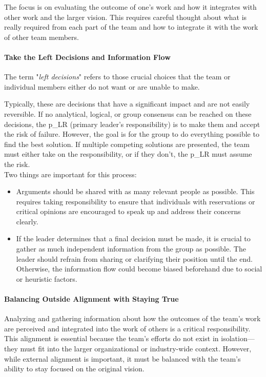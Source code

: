 The focus is on evaluating the outcome of one's work and how it integrates with other work and the larger vision. This requires careful thought about what is really required from each part of the team and how to integrate it with the work of other team members.

\paragraph{Take the Left Decisions and Information Flow}
The term "\textit{left decisions}" refers to those crucial choices that the team or individual members either do not want or are unable to make.

Typically, these are decisions that have a significant impact and are not easily reversible. If no analytical, logical, or group consensus can be reached on these decisions, the \gls{p_LR} (primary leader's responsibility) is to make them and accept the risk of failure. However, the goal is for the group to do everything possible to find the best solution. If multiple competing solutions are presented, the team must either take on the responsibility, or if they don't, the \gls{p_LR} must assume the risk.\\

Two things are important for this process:
\begin{itemize}
	\item Arguments should be shared with as many relevant people as possible. This requires taking responsibility to ensure that individuals with reservations or critical opinions are encouraged to speak up and address their concerns clearly.
	\item If the leader determines that a final decision must be made, it is crucial to gather as much independent information from the group as possible. The leader should refrain from sharing or clarifying their position until the end. Otherwise, the information flow could become biased beforehand due to social or heuristic factors.
\end{itemize}

\paragraph{Balancing Outside Alignment with Staying True}

Analyzing and gathering information about how the outcomes of the team's work are perceived and integrated into the work of others is a critical responsibility. This alignment is essential because the team's efforts do not exist in isolation—they must fit into the larger organizational or industry-wide context. However, while external alignment is important, it must be balanced with the team’s ability to stay focused on the original vision. 

